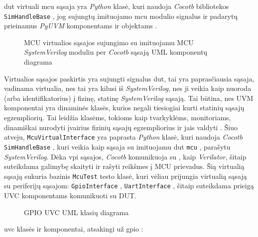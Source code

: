 \gls{dut} virtuali \gls{mcu} sąsaja yra \textit{Python} klasė, kuri naudoja \textit{Cocotb} bibliotekos \texttt{SimHandleBase} , jog sujungtų imituojamo \gls{mcu} modulio signalus ir padarytų prieinamus \textit{PyUVM} komponentams ir objektams \pav{\ref{fig:uml_component_vif}}.

\begin{figure}[H]
	
	\caption{MCU virtualios sąsajos sujungimo su imituojamu MCU \textit{SystemVerilog} moduliu per \textit{Cocotb} sąsają UML komponentų diagrama}
	\label{fig:uml_component_vif}
\end{figure}

Virtualios sąsajos paskirtis yra sujungti signalus \gls{dut}, tai yra paprasčiausia sąsaja, vadinama virtualia, nes tai yra kilusi iš \textit{SystemVerilog}, nes ji veikia kaip nuoroda (arba identifikatorius) į fizinę, statinę \textit{SystemVerilog} sąsają. Tai būtina, nes UVM komponentai yra dinaminės klasės, kurios negali tiesiogiai kurti statinių sąsajų egzempliorių. Tai leidžia klasėms, tokioms kaip tvarkyklėms, monitoriams, dinamiškai nurodyti įvairius fizinių sąsajų egzempliorius ir jais valdyti \cite{easier-uvm}. Šiuo atveju, \texttt{McuVirtualInterface} yra paprasta \textit{Python} klasė, kuri naudoja \textit{Cocotb} \texttt{SimHandleBase} , kuri veikia kaip sąsaja su imituojamu \gls{dut} \texttt{mcu} , parašytu \textit{SystemVerilog}. Dėka \gls{vpi} sąsajos, \textit{Cocotb} komunikuoja su , kaip \textit{Verilator}, šitaip suteikdama galimybę skaityti ir rašyti reikšmes į MCU prievadus. Šią virtualią sąsają sukuria bazinis \texttt{McuTest} testo klasė, kuri vėliau prijungia virtualią sąsają su periferijų sąsajom: \texttt{GpioInterface} \pav{\ref{fig:uml_class_tb_uvc_gpio}}, \texttt{UartInterface} \pav{\ref{fig:uml_class_tb_uvc_uart}}, šitaip suteikdama prieigą UVC komponentams komunikuoti su DUT.

\begin{figure}[H]
	
	\caption{GPIO UVC UML klasių diagrama}
	\label{fig:uml_class_tb_uvc_gpio}
\end{figure}

\gls{uvc} klasės ir komponentai, atsakingi už \gls{gpio}  \pav{\ref{fig:uml_class_tb_uvc_gpio}}:

